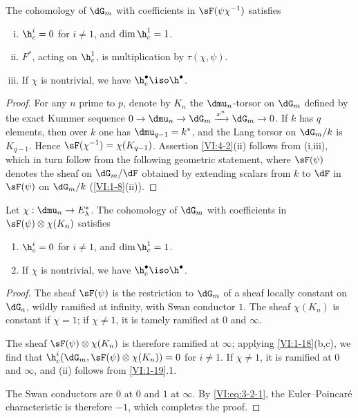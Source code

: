 \begin{proposition_}\label{VI:4-2}
The cohomology of $\dG_m$ with coefficients in $\sF(\psi\chi^{-1})$ satisfies 
\begin{enumerate}[(i)]
  \item $\h_c^i=0$ for $i\ne 1$, and $\dim \h_c^1=1$. 
  \item $F^\ast$, acting on $\h_c^1$, is multiplication by 
    $\tau(\chi,\psi)$. 
  \item If $\chi$ is nontrivial, we have $\h_c^\bullet \iso \h^\bullet$. 
\end{enumerate}
\end{proposition_}
\begin{proof}[Proof]
For any $n$ prime to $p$, denote by $K_n$ the $\dmu_n$-torsor on $\dG_m$ 
defined by the exact Kummer sequence 
$0 \to \dmu_n \to \dG_m \xrightarrow{x^n} \dG_m \to 0$. If $k$ has $q$ 
elements, then over $k$ one has $\dmu_{q-1}=k^\ast$, and the Lang torsor on 
$\dG_m/k$ is $K_{q-1}$. Hence $\sF(\chi^{-1})=\chi(K_{q-1})$. 
Assertion \ref{VI:4-2}(ii) follows from (i,iii), which in turn follow from 
the following geometric statement, where $\sF(\psi)$ denotes the sheaf 
on $\dG_m/\dF$ obtained by extending scalars from $k$ to $\dF$ in 
$\sF(\psi)$ on $\dG_m/k$ (\ref{VI:1-8}(ii)). 
\end{proof}





\begin{proposition_}\label{VI:4-3}
Let $\chi:\dmu_n \to E_\lambda^\ast$. The cohomology of $\dG_m$ with 
coefficients in $\sF(\psi)\otimes \chi(K_n)$ satisfies 
\begin{enumerate}[\indent (i)]
  \item $\h_c^i=0$ for $i\ne 1$, and $\dim \h_c^1{} = 1$. 
  \item If $\chi$ is nontrivial, we have $\h_c^\bullet{}\iso \h^\bullet{}$. 
\end{enumerate}
\end{proposition_}
\begin{proof}[Proof]
The sheaf $\sF(\psi)$ is the restriction to $\dG_m$ of a sheaf locally 
constant on $\dG_a$, wildly ramified at infinity, with Swan conductor 
$1$. The sheaf $\chi(K_n)$ is constant if $\chi=1$; if $\chi\ne 1$, it 
is tamely ramified at $0$ and $\infty$. 

The sheaf $\sF(\psi)\otimes\chi(K_n)$ is therefore ramified at $\infty$; 
applying \ref{VI:1-18}(b,c), we find that 
$\h_c^i(\dG_m,\sF(\psi)\otimes \chi(K_n))=0$ for $i\ne 1$. If $\chi\ne 1$, it 
is ramified at $0$ and $\infty$, and (ii) follows from \ref{VI:1-19}.1. 

The Swan conductors are $0$ at $0$ and $1$ at $\infty$. By 
\eqref{VI:eq:3-2-1}, the Euler--Poincaré characteristic is therefore $-1$, 
which completes the proof. 
\end{proof}






